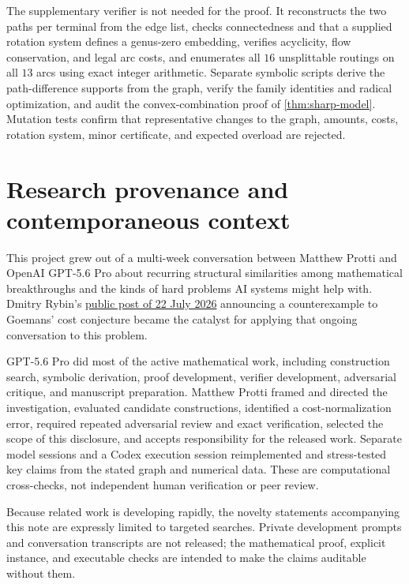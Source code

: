 \documentclass[11pt]{article}
\theoremstyle{remark}
\begin{document}
The supplementary verifier is not needed for the proof.  It reconstructs the
two paths per terminal from the edge list, checks connectedness and that a
supplied rotation system defines a genus-zero embedding, verifies acyclicity,
flow conservation, and legal arc costs, and enumerates all $16$ unsplittable
routings on all $13$ arcs using exact integer arithmetic.  Separate symbolic
scripts derive the path-difference supports from the graph, verify the family
identities and radical optimization, and audit the convex-combination proof
of \cref{thm:sharp-model}.  Mutation tests confirm that representative changes
to the graph, amounts, costs, rotation system, minor certificate, and expected
overload are rejected.

\section{Research provenance and contemporaneous context}

This project grew out of a multi-week conversation between Matthew Protti and
OpenAI GPT-5.6 Pro about recurring structural similarities among mathematical
breakthroughs and the kinds of hard problems AI systems might help with.
Dmitry Rybin's
\href{https://x.com/dmitryrybin1/status/2079904005652893709}{public post of
22 July 2026} announcing a counterexample to Goemans' cost conjecture became
the catalyst for applying that ongoing conversation to this problem.

GPT-5.6 Pro did most of the active mathematical work, including construction
search, symbolic derivation, proof development, verifier development,
adversarial critique, and manuscript preparation.  Matthew Protti framed and
directed the
investigation, evaluated candidate constructions, identified a
cost-normalization error, required repeated adversarial review and exact
verification, selected the scope of this disclosure, and accepts
responsibility for the released work.  Separate model sessions and a Codex
execution session reimplemented and stress-tested key claims from the stated
graph and numerical data.  These are computational cross-checks, not
independent human verification or peer review.

Because related work is developing rapidly, the novelty statements
accompanying this note are expressly limited to targeted searches.  Private
development prompts and conversation transcripts are not released; the
mathematical proof, explicit instance, and executable checks are intended to
make the claims auditable without them.
\end{document}
